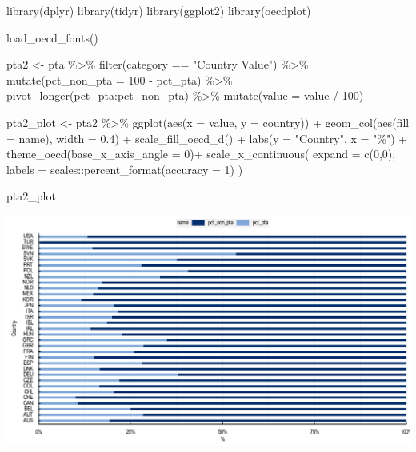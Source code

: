 \documentclass[
  11pt,
  oneside]{report}
\newenvironment{Shaded}{\begin{snugshade}}{\end{snugshade}}
\newcommand{\AttributeTok}[1]{\textcolor[rgb]{0.77,0.63,0.00}{#1}}
\newcommand{\DecValTok}[1]{\textcolor[rgb]{0.00,0.00,0.81}{#1}}
\newcommand{\FloatTok}[1]{\textcolor[rgb]{0.00,0.00,0.81}{#1}}
\newcommand{\FunctionTok}[1]{\textcolor[rgb]{0.00,0.00,0.00}{#1}}
\newcommand{\NormalTok}[1]{#1}
\newcommand{\OtherTok}[1]{\textcolor[rgb]{0.56,0.35,0.01}{#1}}
\newcommand{\SpecialCharTok}[1]{\textcolor[rgb]{0.00,0.00,0.00}{#1}}
\newcommand{\StringTok}[1]{\textcolor[rgb]{0.31,0.60,0.02}{#1}}
\begin{document}
\begin{Shaded}
\begin{Highlighting}[]
\FunctionTok{library}\NormalTok{(dplyr)}
\FunctionTok{library}\NormalTok{(tidyr)}
\FunctionTok{library}\NormalTok{(ggplot2)}
\FunctionTok{library}\NormalTok{(oecdplot)}

\FunctionTok{load\_oecd\_fonts}\NormalTok{()}

\NormalTok{pta2 }\OtherTok{\textless{}{-}}\NormalTok{ pta }\SpecialCharTok{\%\textgreater{}\%} 
  \FunctionTok{filter}\NormalTok{(category }\SpecialCharTok{==} \StringTok{"Country Value"}\NormalTok{) }\SpecialCharTok{\%\textgreater{}\%} 
  \FunctionTok{mutate}\NormalTok{(}\AttributeTok{pct\_non\_pta =} \DecValTok{100} \SpecialCharTok{{-}}\NormalTok{ pct\_pta) }\SpecialCharTok{\%\textgreater{}\%} 
  \FunctionTok{pivot\_longer}\NormalTok{(pct\_pta}\SpecialCharTok{:}\NormalTok{pct\_non\_pta) }\SpecialCharTok{\%\textgreater{}\%} 
  \FunctionTok{mutate}\NormalTok{(}\AttributeTok{value =}\NormalTok{ value }\SpecialCharTok{/} \DecValTok{100}\NormalTok{)}

\NormalTok{pta2\_plot }\OtherTok{\textless{}{-}}\NormalTok{ pta2 }\SpecialCharTok{\%\textgreater{}\%}
  \FunctionTok{ggplot}\NormalTok{(}\FunctionTok{aes}\NormalTok{(}\AttributeTok{x =}\NormalTok{ value, }\AttributeTok{y =}\NormalTok{ country)) }\SpecialCharTok{+}
  \FunctionTok{geom\_col}\NormalTok{(}\FunctionTok{aes}\NormalTok{(}\AttributeTok{fill =}\NormalTok{ name), }\AttributeTok{width =} \FloatTok{0.4}\NormalTok{) }\SpecialCharTok{+}
  \FunctionTok{scale\_fill\_oecd\_d}\NormalTok{() }\SpecialCharTok{+}
  \FunctionTok{labs}\NormalTok{(}\AttributeTok{y =} \StringTok{"Country"}\NormalTok{, }\AttributeTok{x =} \StringTok{"\%"}\NormalTok{) }\SpecialCharTok{+}
  \FunctionTok{theme\_oecd}\NormalTok{(}\AttributeTok{base\_x\_axis\_angle =} \DecValTok{0}\NormalTok{)}\SpecialCharTok{+}
  \FunctionTok{scale\_x\_continuous}\NormalTok{(}
    \AttributeTok{expand =} \FunctionTok{c}\NormalTok{(}\DecValTok{0}\NormalTok{,}\DecValTok{0}\NormalTok{), }
    \AttributeTok{labels =}\NormalTok{ scales}\SpecialCharTok{::}\FunctionTok{percent\_format}\NormalTok{(}\AttributeTok{accuracy =} \DecValTok{1}\NormalTok{)}
\NormalTok{  )}

\NormalTok{pta2\_plot}
\end{Highlighting}
\end{Shaded}

\begin{center}\includegraphics{book_figures/whatif_offmargin_3-1} \end{center}
\end{document}

